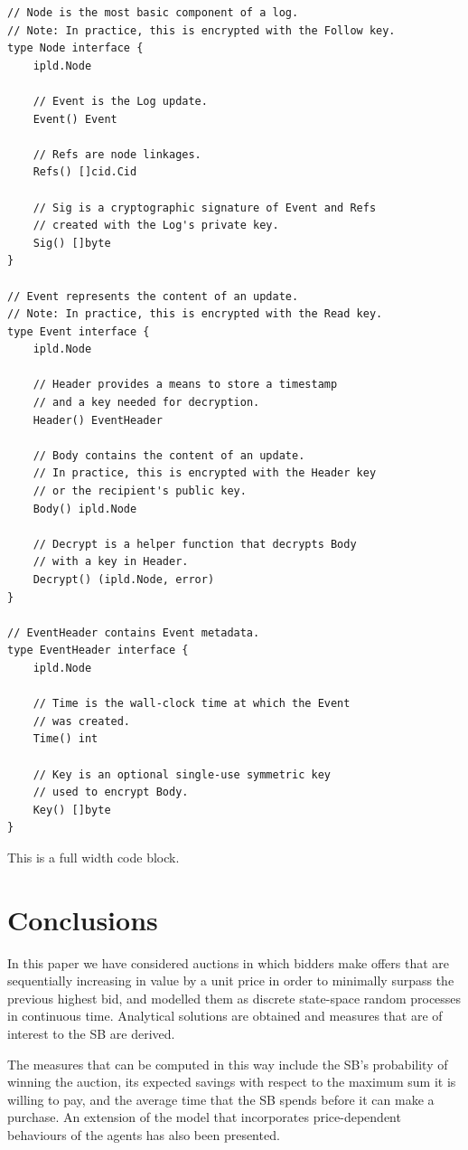 \documentclass{comjnl}
\begin{document}
\begin{example*}

\begin{lstlisting}
// Node is the most basic component of a log.
// Note: In practice, this is encrypted with the Follow key.
type Node interface {
    ipld.Node

    // Event is the Log update.
    Event() Event

    // Refs are node linkages.
    Refs() []cid.Cid

    // Sig is a cryptographic signature of Event and Refs
    // created with the Log's private key.
    Sig() []byte
}

// Event represents the content of an update.
// Note: In practice, this is encrypted with the Read key.
type Event interface {
    ipld.Node

    // Header provides a means to store a timestamp
    // and a key needed for decryption.
    Header() EventHeader

    // Body contains the content of an update.
    // In practice, this is encrypted with the Header key
    // or the recipient's public key.
    Body() ipld.Node

    // Decrypt is a helper function that decrypts Body
    // with a key in Header.
    Decrypt() (ipld.Node, error)
}

// EventHeader contains Event metadata.
type EventHeader interface {
    ipld.Node

    // Time is the wall-clock time at which the Event
    // was created.
    Time() int

    // Key is an optional single-use symmetric key
    // used to encrypt Body.
    Key() []byte
}
\end{lstlisting}
  \caption{This is a full width code block.}

\end{example*}


\section{Conclusions} \label{Conclusions}
In this paper we have considered auctions in which bidders make
offers that are sequentially increasing in value by a unit price
in order to minimally surpass the previous highest bid, and
modelled them as discrete state-space random processes in
continuous time. Analytical solutions are obtained and measures
that are of interest to the SB are derived.

The measures that can be computed in this way include the SB's
probability of winning the auction, its expected savings with
respect to the maximum sum it is willing to pay, and the average
time that the SB spends before it can make a purchase. An
extension of the model that incorporates price-dependent
behaviours of the agents has also been presented.
\end{document}

